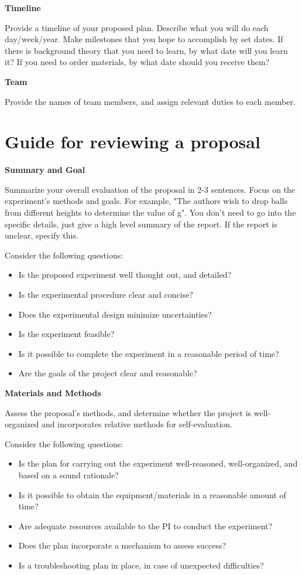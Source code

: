 \textbf{Timeline}

Provide a timeline of your proposed plan. Describe what you will do each day/week/year. Make milestones that you hope to accomplish by set dates. If there is background theory that you need to learn, by what date will you learn it? If you need to order materials, by what date should you receive them?

\textbf{Team}

Provide the names of team members, and assign relevant duties to each member. 

\newpage
\section{Guide for reviewing a proposal}
 \vspace{0.25cm}
\textbf{Summary and Goal}

Summarize your overall evaluation of the proposal in 2-3 sentences. Focus on the experiment's methods and goals. For example, "The authors wish to drop balls from different heights to determine the value of g". You don't need to go into the specific details, just give a high level summary of the report. If the report is unclear, specify this.

Consider the following questions:
\begin{itemize}
\item Is the proposed experiment well thought out, and detailed?
\item Is the experimental procedure clear and concise?
\item Does the experimental design minimize uncertainties?
\item Is the experiment feasible? 
\item Is it possible to complete the experiment in a reasonable period of time?
\item Are the goals of the project clear and reasonable?
\end{itemize}

\textbf{Materials and Methods}

Assess the proposal's methods, and determine whether the project is well-organized and incorporates relative methods for self-evaluation.

Consider the following questions:
\begin{itemize}
\item Is the plan for carrying out the experiment well-reasoned, well-organized, and based on a sound rationale?
\item Is it possible to obtain the equipment/materials in a reasonable amount of time?
\item Are adequate resources available to the PI to conduct the experiment?
\item Does the plan incorporate a mechanism to assess success?
\item Is a troubleshooting plan in place, in case of unexpected difficulties?
\end{itemize}

